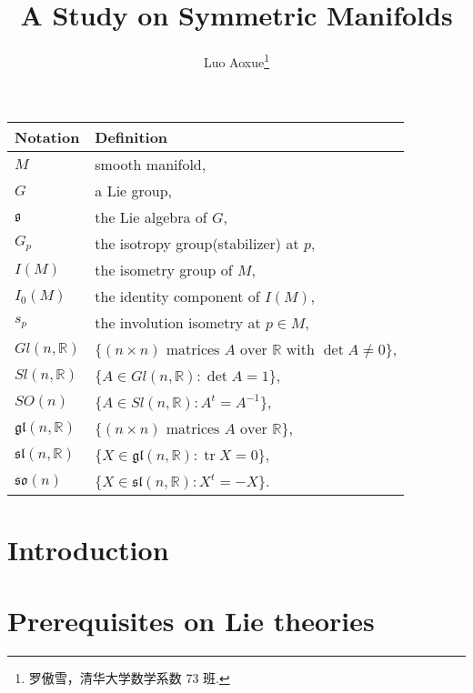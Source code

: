 \documentclass[twoside]{article}
\begin{document}
\title{A Study on Symmetric Manifolds}
\author{Luo Aoxue\footnote{罗傲雪，清华大学数学系数 73 班.}}

\begin{abstract}

\end{abstract}

\begin{center}
  \begin{tabular}{ll}
    \hline
    \textbf{Notation}              & \textbf{Definition} \\
    \hline
    $M$                            & smooth manifold,\\
    $G$                            & a Lie group,\\
    ${\mathfrak g}$                         & the Lie algebra of $G$,\\
    $G_p$                          & the isotropy group(stabilizer) at $p$,\\
    $I(M)$                         & the isometry group of $M$,\\
    $I_0(M)$                       & the identity component of $I(M)$,\\
    $s_p$                          & the involution isometry at $p\in M$,\\
    $Gl(n,\mathbb{R})$             & $\{(n\times n) \text{ matrices } A \text{ over } \mathbb{R} \text{ with } \det A\neq 0\}$,\\
    $Sl(n,\mathbb{R})$             & $\{A \in Gl(n,\mathbb{R}) : \det A =1\}$,\\
    $SO(n)$                        & $\{A \in Sl(n,\mathbb{R}) : A^t=A^{-1}\}$,\\
    $\mathfrak {gl}(n,\mathbb{R})$ & $\{(n\times n) \text{ matrices } A \text{ over } \mathbb{R}\}$,\\
    $\mathfrak{sl}(n,\mathbb{R})$  & $\{X \in \mathfrak {gl}(n,\mathbb{R}) : \operatorname{tr} X=0\}$,\\
    $\mathfrak{so}(n)$             & $\{X \in \mathfrak {sl}(n,\mathbb{R}) : X^t=-X\}$. \\
    \hline
  \end{tabular}
\end{center}

\section{Introduction}



\section{Prerequisites on Lie theories}
\end{document}
